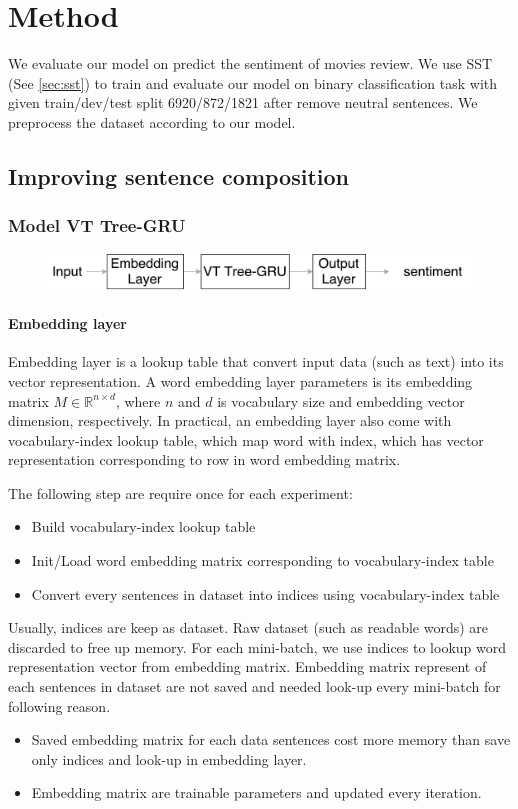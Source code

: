 \chapter{Method}\label{method}
We evaluate our model on predict the sentiment of movies review. We use SST (See \ref{sec:sst}) to train and evaluate our model on binary classification task with given train/dev/test split 6920/872/1821 after remove neutral sentences. We preprocess the dataset according to our model.

\section{Improving sentence composition}

\subsection{Model VT Tree-GRU}\label{sec:VTtree}
\begin{figure}[H]
	\centering
	\includegraphics[width=0.8\linewidth]{figure/vtgrusummary.pdf}
	\caption[Convolution Tree LSTM]{}
	\label{fig:vtgrusummary}
\end{figure}

\subsubsection{Embedding layer}\label{sec:embedding}
Embedding layer is a lookup table that convert input data (such as text) into its vector representation. A word embedding layer parameters is its embedding matrix $M  \in \mathbb{R}^{n \times d}$, where $n$ and $d$ is vocabulary size and embedding vector dimension, respectively. In practical, an embedding layer also come with vocabulary-index lookup table, which map word with index, which has vector representation corresponding to row in word embedding matrix.
  
The following step are require once for each experiment:
\begin{itemize}
	\item Build vocabulary-index lookup table
	\item Init/Load word embedding matrix corresponding to vocabulary-index table
	\item Convert every sentences in dataset into indices using vocabulary-index table  
\end{itemize}
Usually, indices are keep as dataset. Raw dataset (such as readable words) are discarded to free up memory. For each mini-batch, we use indices to lookup word representation vector from embedding matrix. Embedding matrix represent of each sentences in dataset are not saved and needed look-up every mini-batch for following reason.
\begin{itemize}
	\item Saved embedding matrix for each data sentences cost more memory than save only indices and look-up in embedding layer.
	\item Embedding matrix are trainable parameters and updated every iteration.
\end{itemize}

